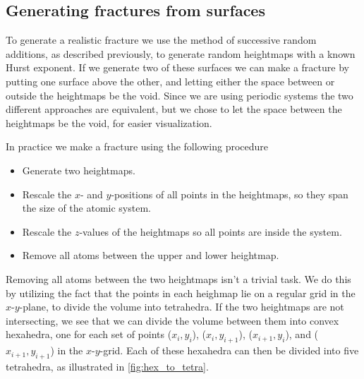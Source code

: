 \subsection{Generating fractures from surfaces}
To generate a realistic fracture we use the method of successive random additions, as described previously, to generate random heightmaps with a known Hurst exponent. If we generate two of these surfaces we can make a fracture by putting one surface above the other, and letting either the space between or outside the heightmaps be the void. Since we are using periodic systems the two different approaches are equivalent, but we chose to let the space between the heightmaps be the void, for easier visualization.

In practice we make a fracture using the following procedure
\begin{itemize}
    \item Generate two heightmaps.
    \item Rescale the $x$- and $y$-positions of all points in the heightmaps, so they span the size of the atomic system.
    \item Rescale the $z$-values of the heightmaps so all points are inside the system.
    \item Remove all atoms between the upper and lower heightmap.
\end{itemize}

Removing all atoms between the two heightmaps isn't a trivial task. We do this by utilizing the fact that the points in each heighmap lie on a regular grid in the $x$-$y$-plane, to divide the volume into tetrahedra. If the two heightmaps are not intersecting, we see that we can divide the volume between them into convex hexahedra, one for each set of points
($x_{i}, y_{i}$), ($x_{i}, y_{i+1}$), ($x_{i+1}, y_{i}$), and ($x_{i+1}, y_{i+1}$) 
in the $x$-$y$-grid. Each of these hexahedra can then be divided into five tetrahedra, as illustrated in \cref{fig:hex_to_tetra}.

% 

